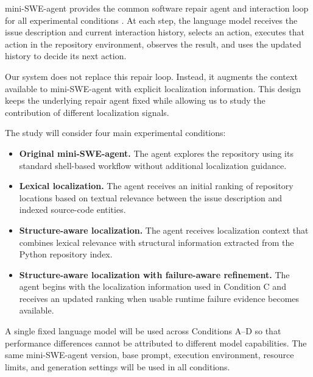 \documentclass[11pt]{article}
\begin{document}
mini-SWE-agent provides the common software repair agent and interaction
loop for all experimental conditions \cite{minisweagent}. At each step,
the language model receives the issue description and current interaction
history, selects an action, executes that action in the repository
environment, observes the result, and uses the updated history to decide
its next action.

Our system does not replace this repair loop. Instead, it augments the
context available to mini-SWE-agent with explicit localization
information. This design keeps the underlying repair agent fixed while
allowing us to study the contribution of different localization signals.

The study will consider four main experimental conditions:

\begin{itemize}[leftmargin=*, itemsep=0.45em]

    \item[\textbf{A.}]
    \textbf{Original mini-SWE-agent.}
    The agent explores the repository using its standard shell-based
    workflow without additional localization guidance.

    \item[\textbf{B.}]
    \textbf{Lexical localization.}
    The agent receives an initial ranking of repository locations based
    on textual relevance between the issue description and indexed
    source-code entities.

    \item[\textbf{C.}]
    \textbf{Structure-aware localization.}
    The agent receives localization context that combines lexical
    relevance with structural information extracted from the
    Python repository index.

    \item[\textbf{D.}]
    \textbf{Structure-aware localization with failure-aware refinement.}
    The agent begins with the localization information used in
    Condition C and receives an updated ranking when usable runtime
    failure evidence becomes available.

\end{itemize}

A single fixed language model will be used across Conditions A--D so that
performance differences cannot be attributed to different model
capabilities. The same mini-SWE-agent version, base prompt, execution
environment, resource limits, and generation settings will be used in all
conditions.
\end{document}
